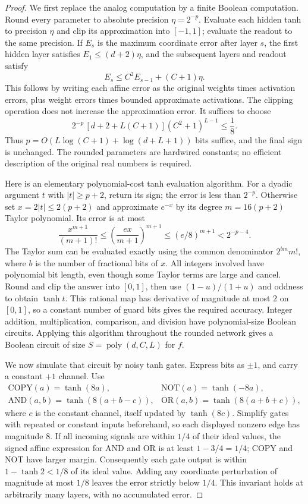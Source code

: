 \begin{proof}
We first replace the analog computation by a finite Boolean computation.
Round every parameter to absolute precision $\eta=2^{-p}$. Evaluate each
hidden tanh to precision $\eta$ and clip its approximation into $[-1,1]$;
evaluate the readout to the same precision. If $E_s$ is the maximum coordinate
error after layer $s$, the first hidden layer satisfies
$E_1\le(d+2)\eta$, and the subsequent layers and readout satisfy
\[
 E_s\le C^2E_{s-1}+(C+1)\eta.
\]
This follows by writing each affine error as the original weights times
activation errors, plus weight errors times bounded approximate activations.
The clipping operation does not increase the approximation error.
It suffices to choose
\[
 2^{-p}\,[d+2+L(C+1)](C^2+1)^{L-1}\le\frac18.
\]
Thus $p=O(L\log(C+1)+\log(d+L+1))$ bits suffice, and the final sign is unchanged.
The rounded parameters are hardwired constants; no efficient description of
the original real numbers is required.

Here is an elementary polynomial-cost tanh evaluation algorithm. For a dyadic
argument $t$ with $|t|\ge p+2$, return its sign; the error is less than $2^{-p}$.
Otherwise set $x=2|t|\le2(p+2)$ and approximate $e^{-x}$ by its degree
$m=16(p+2)$ Taylor polynomial. Its error is at most
\[
 \frac{x^{m+1}}{(m+1)!}
 \le\left(\frac{ex}{m+1}\right)^{m+1}
 \le(e/8)^{m+1}<2^{-p-4}.
\]
The Taylor sum can be evaluated exactly using the common denominator
$2^{bm}m!$, where $b$ is the number of fractional bits of $x$.
All integers involved have polynomial bit length, even though some Taylor
terms are large and cancel. Round and clip the answer into $[0,1]$, then use
$(1-u)/(1+u)$ and oddness to obtain $\tanh t$.
This rational map has derivative of magnitude at most $2$ on $[0,1]$, so a
constant number of guard bits gives the required accuracy. Integer addition,
multiplication, comparison, and division have polynomial-size Boolean
circuits. Applying this algorithm throughout the rounded network gives a
Boolean circuit of size $S=\operatorname{poly}(d,C,L)$ for $f$.

We now simulate that circuit by noisy tanh gates. Express bits as $\pm1$, and
carry a constant $+1$ channel. Use
\[
 \begin{array}{ll}
 \mathrm{COPY}(a)=\tanh(8a),&\mathrm{NOT}(a)=\tanh(-8a),\\
 \mathrm{AND}(a,b)=\tanh(8(a+b-c)),&
 \mathrm{OR}(a,b)=\tanh(8(a+b+c)),
 \end{array}
\]
where $c$ is the constant channel, itself updated by $\tanh(8c)$.
Simplify gates with repeated or constant inputs beforehand, so each displayed
nonzero edge has magnitude $8$.
If all incoming signals are within $1/4$ of their ideal values, the signed
affine expression for AND and OR is at least $1-3/4=1/4$; COPY and NOT have
larger margin. Consequently each gate output is within
$1-\tanh2<1/8$ of its ideal value. Adding any coordinate perturbation of
magnitude at most $1/8$ leaves the error strictly below $1/4$.
This invariant holds at arbitrarily many layers, with no accumulated error.


\end{proof}
